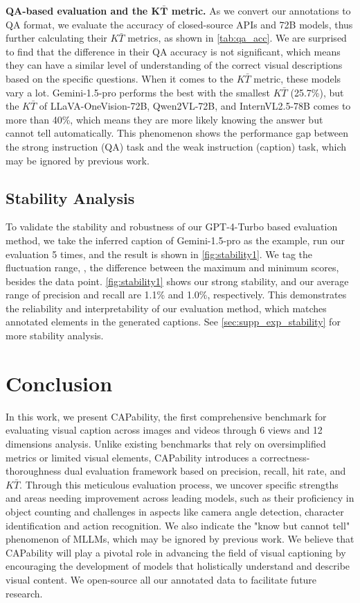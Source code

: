 \noindent\textbf{QA-based evaluation and the $\bm{K\bar{T}}$ metric.}
As we convert our annotations to QA format, we evaluate the accuracy of closed-source APIs and 72B models, thus further calculating their $K\bar{T}$ metrics, as shown in \cref{tab:qa_acc}. We are surprised to find that the difference in their QA accuracy is not significant, which means they can have a similar level of understanding of the correct visual descriptions based on the specific questions. When it comes to the $K\bar{T}$ metric, these models vary a lot. Gemini-1.5-pro performs the best with the smallest $K\bar{T}$ (25.7\%), but the $K\bar{T}$ of LLaVA-OneVision-72B, Qwen2VL-72B, and InternVL2.5-78B comes to more than 40\%, which means they are more likely knowing the answer but cannot tell automatically. This phenomenon shows the performance gap between the strong instruction (QA) task and the weak instruction (caption) task, which may be ignored by previous work.


\subsection{Stability Analysis}
To validate the stability and robustness of our GPT-4-Turbo based evaluation method, we take the inferred caption of Gemini-1.5-pro as the example, run our evaluation 5 times, and the result is shown in \cref{fig:stability1}. We tag the fluctuation range, \ie, the difference between the maximum and minimum scores, besides the data point. \cref{fig:stability1} shows our strong stability, and our average range of precision and recall are 1.1\% and 1.0\%, respectively. This demonstrates the reliability and interpretability of our evaluation method, which matches annotated elements in the generated captions. See \cref{sec:supp_exp_stability} for more stability analysis.


\section{Conclusion}
\label{sec:conclusion}
In this work, we present CAPability, the first comprehensive benchmark for evaluating visual caption across images and videos through 6 views and 12 dimensions analysis. Unlike existing benchmarks that rely on oversimplified metrics or limited visual elements, CAPability introduces a correctness-thoroughness dual evaluation framework based on precision, recall, hit rate, and $K\bar{T}$. Through this meticulous evaluation process, we uncover specific strengths and areas needing improvement across leading models, such as their proficiency in object counting and challenges in aspects like camera angle detection, character identification and action recognition. We also indicate the "know but cannot tell" phenomenon of MLLMs, which may be ignored by previous work. We believe that CAPability will play a pivotal role in advancing the field of visual captioning by encouraging the development of models that holistically understand and describe visual content. 
We open-source all our annotated data to facilitate future research.